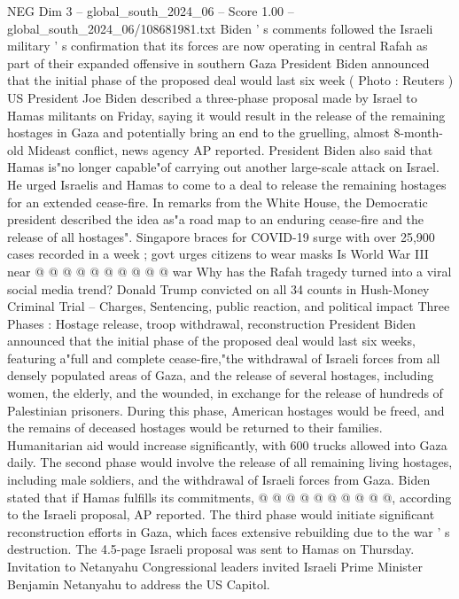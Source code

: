 \begin{textsample}{NEG Dim 3 – global\_south\_2024\_06 – Score 1.00 – global\_south\_2024\_06/108681981.txt}  \label{ex:f3_neg_115}
Biden ' s comments followed the Israeli military ' s confirmation that its forces are now operating in central Rafah as part of their expanded offensive in southern Gaza President Biden announced that the initial phase of the proposed deal would last six week ( Photo : Reuters ) US President Joe Biden described a three-phase proposal made by Israel to Hamas militants on Friday, saying it would result in the release of the remaining hostages in Gaza and potentially bring an end to the gruelling, almost 8-month-old Mideast conflict, news agency AP reported.
President Biden also said that Hamas is"no longer capable"of carrying out another large-scale attack on Israel.
He urged Israelis and Hamas to come to a deal to release the remaining hostages for an extended cease-fire.
In remarks from the White House, the Democratic president described the idea as"a road map to an enduring cease-fire and the release of all hostages".
Singapore braces for COVID-19 surge with over 25,900 cases recorded in a week ; govt urges citizens to wear masks Is World War III near @ @ @ @ @ @ @ @ @ @ war Why has the Rafah tragedy turned into a viral social media trend?
Donald Trump convicted on all 34 counts in Hush-Money Criminal Trial -- Charges, Sentencing, public reaction, and political impact Three Phases : Hostage release, troop withdrawal, reconstruction President Biden announced that the initial phase of the proposed deal would last six weeks, featuring a"full and complete cease-fire,"the withdrawal of Israeli forces from all densely populated areas of Gaza, and the release of several hostages, including women, the elderly, and the wounded, in exchange for the release of hundreds of Palestinian prisoners.
During this phase, American hostages would be freed, and the remains of deceased hostages would be returned to their families.
Humanitarian aid would increase significantly, with 600 trucks allowed into Gaza daily.
The second phase would involve the release of all remaining living hostages, including male soldiers, and the withdrawal of Israeli forces from Gaza.
Biden stated that if Hamas fulfills its commitments, @ @ @ @ @ @ @ @ @ @, according to the Israeli proposal, AP reported.
The third phase would initiate significant reconstruction efforts in Gaza, which faces extensive rebuilding due to the war ' s destruction.
The 4.5-page Israeli proposal was sent to Hamas on Thursday.
Invitation to Netanyahu Congressional leaders invited Israeli Prime Minister Benjamin Netanyahu to address the US Capitol.

\end{textsample}
